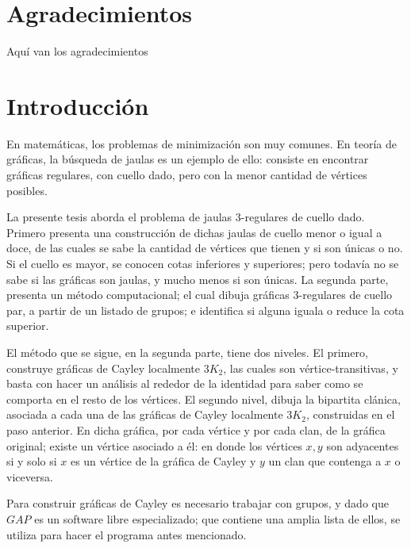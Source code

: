\documentclass[12pt]{book}
\theoremstyle{definition}
\begin{document}
\chapter*{Agradecimientos}
Aquí van los agradecimientos



\newpage \thispagestyle{empty}




\chapter{Introducción}

En matemáticas, los problemas de minimización son muy comunes.
En teoría de gráficas, la búsqueda de jaulas es un ejemplo de
ello: consiste en encontrar gráficas regulares, con cuello dado,
pero con la menor cantidad de vértices posibles.


La presente tesis aborda el problema de jaulas 3-regulares de
cuello dado. Primero presenta una construcción de dichas jaulas de
cuello menor o igual a doce, de las cuales se sabe la
cantidad de vértices que tienen y si son únicas o no. Si el cuello
es mayor, se conocen cotas inferiores y superiores; pero todavía
no se sabe si las gráficas son jaulas, y mucho menos si son
únicas.  La segunda parte, presenta un método computacional; el
cual dibuja gráficas $3$-regulares de cuello par, a partir de un
listado de grupos; e identifica si alguna iguala o reduce la cota
superior.


El método que se sigue, en la segunda parte, tiene dos niveles. El
primero, construye gráficas de Cayley localmente $3K_2$, las
cuales son vértice-transitivas, y basta con hacer un análisis al
rededor de la identidad para saber como se comporta en el resto de
los vértices. El segundo nivel, dibuja la bipartita clánica,
asociada a cada una de las gráficas de Cayley localmente $3K_2$,
construidas en el paso anterior. En dicha gráfica, por cada
vértice y por cada clan, de la gráfica original; existe un vértice
asociado a \'el: en donde los vértices $x,y$ son adyacentes si y
solo si $x$ es un vértice de la gráfica de Cayley y $y$ un clan
que contenga a $x$ o viceversa.

Para construir gráficas de Cayley es necesario trabajar con
grupos, y dado que $GAP$ es un software libre especializado; que
contiene una amplia lista de ellos, se utiliza para hacer el
programa antes mencionado.



\tableofcontents
\end{document}
